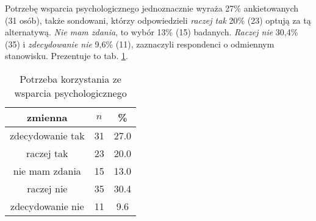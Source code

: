

 Potrzebę wsparcia psychologicznego jednoznacznie wyraża 27\% ankietowanych (31 osób), także sondowani, którzy odpowiedzieli \textit{raczej tak} 20\% (23) optują za tą alternatywą. \textit{Nie mam zdania}, to wybór 13\% (15) badanych. \textit{Raczej nie} 30,4\% (35) i \textit{zdecydowanie nie} 9,6\% (11), zaznaczyli respondenci o odmiennym stanowisku. Prezentuje to tab. \ref{tab:Q22}.
\begin{table}[H]
\caption{Potrzeba korzystania ze wsparcia psychologicznego}
\centering
\begin{tabular}{ | c | c | c |}
\hline
zmienna & $n$ & \% \\
\hline
zdecydowanie tak  &  31  & 27.0\\
\hline
raczej tak  &  23  & 20.0\\
\hline
nie mam zdania  &  15  & 13.0\\
\hline
raczej nie  &  35  & 30.4\\
\hline
zdecydowanie nie  &  11  & 9.6\\
\hline
\end{tabular}
\label{tab:Q22}
\end{table}
